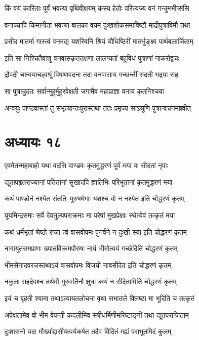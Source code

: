 \twolineshloka
{किं वयं कारिताः पूर्वं भवत्या पृथिवीक्षयम्}
{कस्य हेतोः परित्यज्य वनं गन्तुमभीप्ससि}


\twolineshloka
{वनाच्चापि किमानीता भवत्या बालका वयम्}
{दुःखशोकसमाविष्टौ माद्रीपुत्राविमौ तथा}


\twolineshloka
{प्रसीद मातर्मा गास्त्वं वनमद्य यशस्विनि}
{श्रियं यौधिष्ठिरीं मातर्भुङ्क्ष्व पार्थबलार्जिताम्}


\twolineshloka
{इति सा निश्चितैवाशु वनवासकृततक्षणा}
{लालप्यतां बहुविधं पुत्राणां नाकरोद्वचः}


\twolineshloka
{द्रौपदी चान्वयाच्छ्वश्रूं विषष्णवदना तदा}
{वनवासाय गच्छन्तीं रुदती भद्रया सह}


\twolineshloka
{सा पुत्रान्रुदतः सर्वान्मुहुर्मुहुरवेक्षती}
{जगामैव महाप्राज्ञा वनाय कृतनिश्चया}


\twolineshloka
{अन्वयुः पाण्डवास्तां तु सभृत्यान्तःपुरास्तथा}
{ततः प्रमृज्य साऽश्रूणि पुत्रान्वचनमब्रवीत्}


\chapter{अध्यायः १८}
\twolineshloka
{एवमेतन्महाबाहो यथा वदसि पाण्डवः}
{कृतमुद्धरणं पूर्वं मया वः सीदतां नृपाः}


\twolineshloka
{द्यूतापहृतराज्यानां पतितानां सुखादपि}
{ज्ञातिभिः परिभूतानां कृतमुद्धरणं मया}


\twolineshloka
{कथं पाण्डोर्न नश्येत संततिः पुरुषर्षभाः}
{यशश्च वो न नश्येत इति चोद्धरणं कृतम्}


\twolineshloka
{यूयमिन्द्रसमाः सर्वे देवतुल्यपराक्रमाः}
{मा परेषां मुखप्रेक्षाः स्थेत्येवं तत्कृतं मया}


\twolineshloka
{कथं धर्मभृतां श्रेष्ठो राजा त्वं वासवोपमः}
{पुनर्वने न दुःखी स्या इति चोद्धरणं कृतम्}


\twolineshloka
{नागायुतसमप्राणः ख्यातविक्रमपौरुषः}
{नायं भीमोत्ययं गच्छेदिति चोद्धरणं कृतम्}


\twolineshloka
{भीमसेनादवरजस्तथाऽयं वासवोपमः}
{विजयो नावसीदेत इति चोद्धरणं कृतम्}


\twolineshloka
{नकुलः सहदेवश्च तथेमौ गुरुवर्तिनौ}
{क्षुधा कथं न सीदेतामिति चोद्धरणं कृतम्}


\twolineshloka
{इयं च बृहती श्यामा तथाऽत्यायतलोचना}
{वृथा सभातले क्लिष्टा मा भूदिति च तत्कृतं}


\twolineshloka
{अपेक्षतामेव वो भीम वेपन्तीं कदलीमिव}
{स्त्रीधर्मिणीमरिष्टाङ्गीं तथा द्यूतपराजिताम्}


\twolineshloka
{दुःशासनो यदा मौर्ख्याद्दासीवत्पर्यकर्षत}
{तदैव विदितं मह्यं पराभूतमिदं कुलम्}


